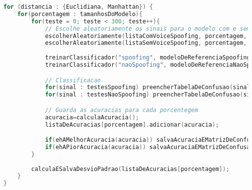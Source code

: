\begin{lstlisting}[language=C++]
for (distancia : {Euclidiana, Manhattan}) {
	for(porcentagem : tamanhosDoModelo){
		for(teste = 0; teste < 300; teste++){
			// Escolhe aleatoriamente os sinais para o modelo com e sem spoofing
			escolherAleatoriamente(listaComVoiceSpoofing, porcentagem, modeloDeReferenciaSpoofing, testesSpoofing);
			escolherAleatoriamente(listaSemVoiceSpoofing, porcentagem, modeloDeReferenciaNaoSpoofing, testesNaoSpoofing);
			
			treinarClassificador("spoofing", modeloDeReferenciaSpoofing);
			treinarClassificador("naoSpoofing", modeloDeReferenciaNaoSpoofing);

			// Classificacao
			for(sinal : testesSpoofing) preencherTabelaDeConfusao(sinal, "spoofing"); 
			for(sinal : testesNaoSpoofing) preencherTabelaDeConfusao(sinal, "naoSpoofing");

			// Guarda as acuracias para cada porcentegem
			acuracia=calculaAcuracia();
			listaDeAcuracias[porcentagem].adicionar(acuracia);

			if(ehAMelhorAcuracia(acuracia)) salvaAcuraciaEMatrizDeConfusao();
			if(ehAPiorAcuracia(acuracia)) salvaAcuraciaEMatrizDeConfusao();
		}
		
		calculaESalvaDesvioPadrao(listaDeAcuracias[porcentagem]);
	}
}				
\end{lstlisting}